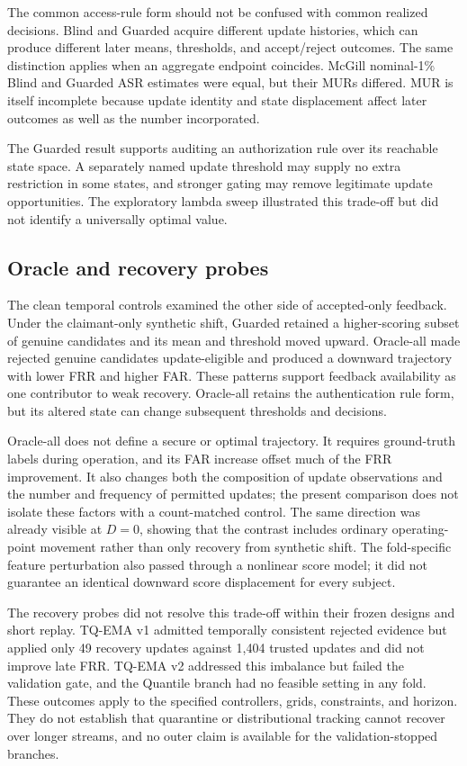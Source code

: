 \documentclass[technologies,article,submit,moreauthors]{Definitions/mdpi}
\begin{document}
The common access-rule form should not be confused with common realized decisions. Blind and Guarded acquire different update histories, which can produce different later means, thresholds, and accept/reject outcomes. The same distinction applies when an aggregate endpoint coincides. McGill nominal-1\% Blind and Guarded ASR estimates were equal, but their MURs differed. MUR is itself incomplete because update identity and state displacement affect later outcomes as well as the number incorporated.

The Guarded result supports auditing an authorization rule over its reachable state space. A separately named update threshold may supply no extra restriction in some states, and stronger gating may remove legitimate update opportunities. The exploratory lambda sweep illustrated this trade-off but did not identify a universally optimal value.

\subsection{Oracle and recovery probes}\label{sec:oracle-and-recovery-probes}

The clean temporal controls examined the other side of accepted-only feedback. Under the claimant-only synthetic shift, Guarded retained a higher-scoring subset of genuine candidates and its mean and threshold moved upward. Oracle-all made rejected genuine candidates update-eligible and produced a downward trajectory with lower FRR and higher FAR. These patterns support feedback availability as one contributor to weak recovery. Oracle-all retains the authentication rule form, but its altered state can change subsequent thresholds and decisions.

Oracle-all does not define a secure or optimal trajectory. It requires ground-truth labels during operation, and its FAR increase offset much of the FRR improvement. It also changes both the composition of update observations and the number and frequency of permitted updates; the present comparison does not isolate these factors with a count-matched control. The same direction was already visible at \(D=0\), showing that the contrast includes ordinary operating-point movement rather than only recovery from synthetic shift. The fold-specific feature perturbation also passed through a nonlinear score model; it did not guarantee an identical downward score displacement for every subject.

The recovery probes did not resolve this trade-off within their frozen designs and short replay. TQ-EMA v1 admitted temporally consistent rejected evidence but applied only 49 recovery updates against 1,404 trusted updates and did not improve late FRR. TQ-EMA v2 addressed this imbalance but failed the validation gate, and the Quantile branch had no feasible setting in any fold. These outcomes apply to the specified controllers, grids, constraints, and horizon. They do not establish that quarantine or distributional tracking cannot recover over longer streams, and no outer claim is available for the validation-stopped branches.
\end{document}
